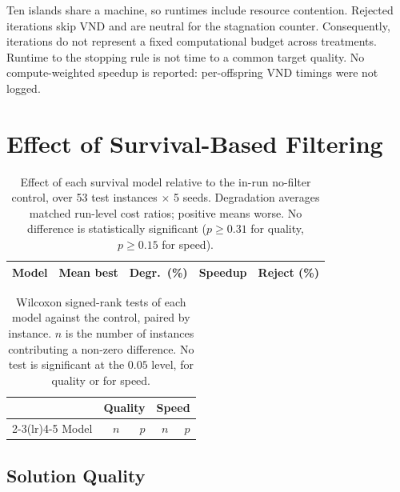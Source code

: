 \documentclass[a4paper,fleqn]{cas-dc}
\begin{document}
Ten islands share a machine, so runtimes include resource contention. Rejected
iterations skip VND and are neutral for the stagnation counter. Consequently,
iterations do not represent a fixed computational budget across treatments.
Runtime to the stopping rule is not time to a common target quality. No
compute-weighted speedup is reported: per-offspring VND timings were not logged.

\section{Effect of Survival-Based Filtering}\label{sec:results}

\begin{table}[!tbp]
\caption{Effect of each survival model relative to the in-run no-filter control,
over 53 test instances $\times$ 5 seeds. Degradation averages matched run-level cost ratios;
positive means worse. No difference is statistically significant
($p \geq 0.31$ for quality, $p \geq 0.15$ for speed).}
\label{tab:model-comparison}
\centering\small
\begin{tabular}{lrrrr}
\toprule
Model & Mean best & Degr.\ (\%) & Speedup & Reject (\%) \\
\midrule

\end{tabular}
\end{table}

\begin{table}[htbp]
\caption{Wilcoxon signed-rank tests of each model against the control, paired by
instance. $n$ is the number of instances contributing a non-zero difference. No
test is significant at the $0.05$ level, for quality or for speed.}
\label{tab:wilcoxon}
\centering\small
\begin{tabular}{lrrrr}
\toprule
& \multicolumn{2}{c}{Quality} & \multicolumn{2}{c}{Speed} \\
\cmidrule(lr){2-3}\cmidrule(lr){4-5}
Model & $n$ & $p$ & $n$ & $p$ \\
\midrule

\end{tabular}
\end{table}

\subsection{Solution Quality}\label{sec:res-quality}
\end{document}
